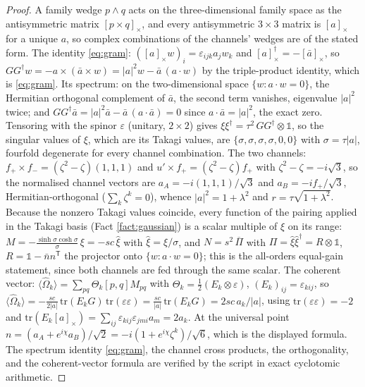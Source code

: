 \documentclass[11pt]{article}
\theoremstyle{definition}
\begin{document}
\begin{proof}
A family wedge $p \wedge q$ acts on the three-dimensional family space as the antisymmetric matrix $[p \times q]_{\times}$, and every antisymmetric $3 \times 3$ matrix is $[a]_{\times}$ for a unique $a$, so complex combinations of the channels' wedges are of the stated form. The identity \eqref{eq:gram}: $([a]_{\times}w)_{i} = \varepsilon_{ijk}a_{j}w_{k}$ and $[a]_{\times}^{\dagger} = -[\bar a]_{\times}$, so $GG^{\dagger}w = -a \times (\bar a \times w) = |a|^{2}w - \bar{a}\,(a \cdot w)$ by the triple-product identity, which is \eqref{eq:gram}. Its spectrum: on the two-dimensional space $\{w : a \cdot w = 0\}$, the Hermitian orthogonal complement of $\bar a$, the second term vanishes, eigenvalue $|a|^{2}$ twice; and $GG^{\dagger}\bar{a} = |a|^{2}\bar{a} - \bar{a}\,(a \cdot \bar{a}) = 0$ since $a \cdot \bar{a} = |a|^{2}$, the exact zero. Tensoring with the spinor $\varepsilon$ (unitary, $2 \times 2$) gives $\xi\xi^{\dagger} = \tau^{2}\,GG^{\dagger} \otimes \mathbb{1}$, so the singular values of $\xi$, which are its Takagi values, are $\{\sigma, \sigma, \sigma, \sigma, 0, 0\}$ with $\sigma = \tau|a|$, fourfold degenerate for every channel combination. The two channels: $f_{+} \times f_{-} = (\zeta^{2} - \zeta)(1,1,1)$ and $u' \times f_{+} = (\zeta^{2} - \zeta)f_{+}$ with $\zeta^{2} - \zeta = -i\sqrt{3}$, so the normalised channel vectors are $a_{A} = -i(1,1,1)/\sqrt{3}$ and $a_{B} = -if_{+}/\sqrt{3}$, Hermitian-orthogonal ($\sum_{k}\zeta^{k} = 0$), whence $|a|^{2} = 1 + \lambda^{2}$ and $r = \tau\sqrt{1+\lambda^{2}}$. Because the nonzero Takagi values coincide, every function of the pairing applied in the Takagi basis (Fact \ref{fact:gaussian}) is a scalar multiple of $\xi$ on its range: $M = -\tfrac{\sinh\sigma\cosh\sigma}{\sigma}\,\xi = -sc\,\hat\xi$ with $\hat\xi = \xi/\sigma$, and $N = s^{2}\,\overline{\Pi}$ with $\Pi = \hat\xi\hat\xi^{\dagger} = R \otimes \mathbb{1}$, $R = \mathbb{1} - \bar{n}n^{\mathsf{T}}$ the projector onto $\{w : a \cdot w = 0\}$; this is the all-orders equal-gain statement, since both channels are fed through the same scalar. The coherent vector: $\langle\hat\Omega_{k}\rangle = \sum_{pq}\Theta_{k}[p,q]M_{pq}$ with $\Theta_{k} = \tfrac12(E_{k} \otimes \varepsilon)$, $(E_{k})_{ij} = \varepsilon_{kij}$, so $\langle\hat\Omega_{k}\rangle = -\tfrac{sc}{2|a|}\,\mathrm{tr}(E_{k}G)\,\mathrm{tr}(\varepsilon\varepsilon) = \tfrac{sc}{|a|}\,\mathrm{tr}(E_{k}G) = 2sc\,a_{k}/|a|$, using $\mathrm{tr}(\varepsilon\varepsilon) = -2$ and $\mathrm{tr}(E_{k}[a]_{\times}) = \sum_{ij}\varepsilon_{kij}\varepsilon_{jmi}a_{m} = 2a_{k}$. At the universal point $n = (a_{A} + e^{i\chi}a_{B})/\sqrt{2} = -i(1 + e^{i\chi}\zeta^{k})/\sqrt{6}$, which is the displayed formula. The spectrum identity \eqref{eq:gram}, the channel cross products, the orthogonality, and the coherent-vector formula are verified by the script in exact cyclotomic arithmetic.
\end{proof}
\end{document}
